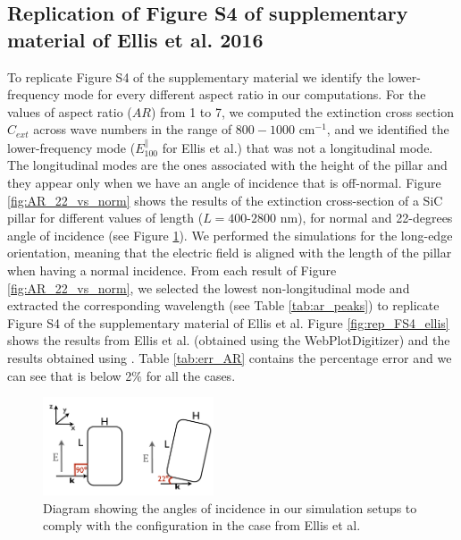 \subsection{Replication of Figure S4 of supplementary material of Ellis et al. 2016}

To replicate Figure S4 of the supplementary material we identify the lower-frequency mode for every different 
aspect ratio in our computations. For the values of aspect ratio ($AR$) from 1 to 7, we computed the extinction cross section 
$C_{ext}$ across wave numbers in the range of $800-1000$ cm$^{-1}$, and we identified the lower-frequency mode 
($E^{\parallel}_{100}$ for Ellis et al.) that was not a longitudinal mode. The longitudinal modes are the ones associated with 
the height of the pillar and they appear only when we have an angle of incidence that is off-normal. 
Figure \ref{fig:AR_22_vs_norm} shows the results of the extinction cross-section of a SiC pillar for different values of 
length ($L=400$-$2800$ nm), for normal and 22-degrees angle of incidence (see Figure \ref{fig:ellis_ang_inc}). We performed 
the simulations for the long-edge orientation, meaning that the electric field is aligned with the length of the pillar when having a normal 
incidence. From each result of Figure \ref{fig:AR_22_vs_norm}, we selected the lowest non-longitudinal mode and extracted the corresponding wavelength
(see Table \ref{tab:ar_peaks}) to replicate Figure S4 of the supplementary material of Ellis et al. Figure \ref{fig:rep_FS4_ellis} shows the
results from Ellis et al. (obtained using the WebPlotDigitizer) and the results obtained using \pygbe. Table \ref{tab:err_AR} contains the 
percentage error and we can see that is below 2$\%$ for all the cases.

\begin{figure}
    \centering
    \includegraphics[width=0.45\textwidth]{ellis_ang_inc.pdf} 
    \caption{Diagram showing the angles of incidence in our simulation setups to comply with the configuration in the case from Ellis et al.}
    \label{fig:ellis_ang_inc}
\end{figure}

